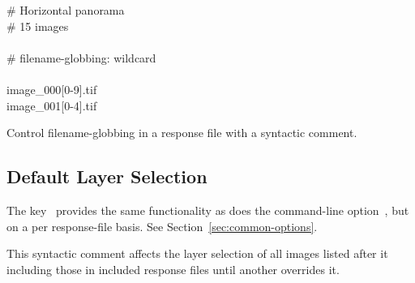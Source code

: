 \begin{exemplar}[htbp]
  \begin{literal}
    \# Horizontal panorama \\
    \# 15 images \\
    \mbox{} \\
    \# filename-globbing: wildcard \\
    \mbox{} \\
    image\_000[0-9].tif \\
    image\_001[0-4].tif \\
  \end{literal}

  \caption[Filename-globbing syntactic comment]{Control
    filename-globbing in a response file with a syntactic
    comment.\label{ex:globbing-algorithm}}
\end{exemplar}


\subsection[Default Layer Selection]{Default Layer Selection
  \label{sec:default-layer-selection}
  }

The key~ provides the same
functionality as does the command\hyp{}line
option~, but on a per response\hyp{}file
basis.  See Section~\ref{sec:common-options}.

This syntactic comment affects the layer selection of all images
listed after it including those in included response files until
another  overrides it.

